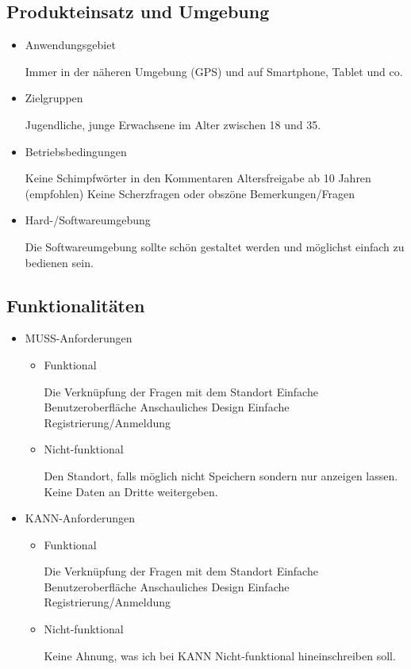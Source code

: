 \subsection{Produkteinsatz und Umgebung}
\begin{itemize}
	\item Anwendungsgebiet
	
	Immer in der näheren Umgebung (GPS) und auf Smartphone, Tablet und co.
	
	\item Zielgruppen
	
	Jugendliche, junge Erwachsene im Alter zwischen 18 und 35.
	
	\item Betriebsbedingungen
	
	Keine Schimpfwörter in den Kommentaren
	Altersfreigabe ab 10 Jahren (empfohlen)
	Keine Scherzfragen oder obszöne Bemerkungen/Fragen
	
	\item Hard-/Softwareumgebung
	
	Die Softwareumgebung sollte schön gestaltet werden und möglichst einfach zu bedienen sein.
	
\end{itemize}
\subsection{Funktionalitäten}
\begin{itemize}
	\item MUSS-Anforderungen
	\begin{itemize}
		\item Funktional
		
		Die Verknüpfung der Fragen mit dem Standort
		Einfache Benutzeroberfläche
		Anschauliches Design
		Einfache Registrierung/Anmeldung
		
		\item Nicht-funktional
		
		Den Standort, falls möglich nicht Speichern sondern nur anzeigen lassen.
		Keine Daten an Dritte weitergeben.
		
	\end{itemize}
	\item KANN-Anforderungen
	\begin{itemize}
		\item Funktional
		
		Die Verknüpfung der Fragen mit dem Standort
		Einfache Benutzeroberfläche
		Anschauliches Design
		Einfache Registrierung/Anmeldung
		
		
		\item Nicht-funktional
		
		Keine Ahnung, was ich bei KANN Nicht-funktional hineinschreiben soll.
		
	\end{itemize}
\end{itemize}
